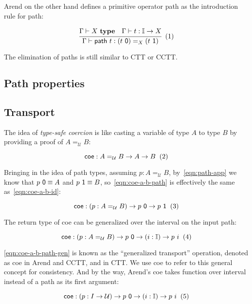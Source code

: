 Arend on the other hand defines a primitive operator \textsf{path}
as the introduction rule for path:

\[
  \cfrac{
    \Gamma \vdash X \ \textbf{type}
    \quad
    \Gamma \vdash t : \mathbb I \rightarrow X
  }{
    \Gamma \vdash \textsf{path} \ t : (t \ \textsf 0) =_X (t \ \textsf 1)
  }
  \xtag
\]

The elimination of paths is still similar to CTT or CCTT.

\subsection{Path properties}
\label{subsec:path-prop}


\subsection{Transport}
\label{subsec:coe}

The idea of \textit{type-safe coercion} is like
casting a variable of type $A$ to type $B$ by providing a proof
of $A =_{\mathcal U} B$:

\[
  \textsf{coe} : A =_{\mathcal U} B \rightarrow A \rightarrow B
  \xtag \label{eqn:coe-a-b-id}
\]

Bringing in the idea of path types,
assuming $p : A =_{\mathcal U} B$, by~\ref{eqn:path-app}
we know that $p \ \textsf 0 \equiv A$ and
$p \ \textsf 1 \equiv B$,
so~\ref{eqn:coe-a-b-path} is effectively the same
as~\ref{eqn:coe-a-b-id}:

\[
  \textsf{coe} : (p : A =_{\mathcal U} B) \rightarrow p \ \textsf 0
  \rightarrow p \ \textsf 1
  \xtag \label{eqn:coe-a-b-path}
\]

The return type of \textsf{coe} can be generalized over
the interval on the input path:

\[
  \textsf{coe} : (p : A =_{\mathcal U} B) \rightarrow p \ \textsf 0
  \rightarrow (i : \mathbb I) \rightarrow p \ i
  \xtag \label{eqn:coe-a-b-path-gen}
\]

\ref{eqn:coe-a-b-path-gen} is known as the ``generalized transport''
operation, denoted as \textsf{coe} in Arend and CCTT,
and  in CTT.
We use \textsf{coe} to refer to this general concept for consistency.
And by the way,
Arend's \textsf{coe} takes function over interval instead
of a path as its first argument:

\[
  \textsf{coe} : (p : I \rightarrow \mathcal U)
  \rightarrow p \ \textsf 0
  \rightarrow (i : \mathbb I) \rightarrow p \ i
  \xtag
\]

